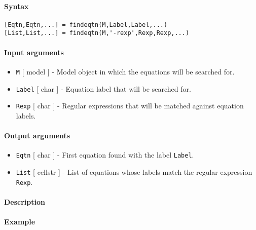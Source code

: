 


	\paragraph{Syntax}\label{syntax}

\begin{verbatim}
[Eqtn,Eqtn,...] = findeqtn(M,Label,Label,...)
[List,List,...] = findeqtn(M,'-rexp',Rexp,Rexp,...)
\end{verbatim}

\paragraph{Input arguments}\label{input-arguments}

\begin{itemize}
\item
  \texttt{M} {[} model {]} - Model object in which the equations will be
  searched for.
\item
  \texttt{Label} {[} char {]} - Equation label that will be searched
  for.
\item
  \texttt{Rexp} {[} char {]} - Regular expressions that will be matched
  against equation labels.
\end{itemize}

\paragraph{Output arguments}\label{output-arguments}

\begin{itemize}
\item
  \texttt{Eqtn} {[} char {]} - First equation found with the label
  \texttt{Label}.
\item
  \texttt{List} {[} cellstr {]} - List of equations whose labels match
  the regular expression \texttt{Rexp}.
\end{itemize}

\paragraph{Description}\label{description}

\paragraph{Example}\label{example}


